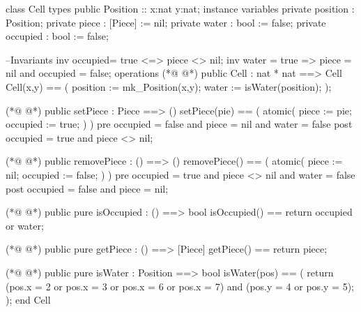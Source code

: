 \begin{vdmpp}[breaklines=true]
class Cell
types
 public Position :: x:nat y:nat;
instance variables
 private position : Position;
 private piece :  [Piece] := nil;
 private water : bool := false;
 private occupied : bool := false;
 
 --Invariants
 inv occupied= true <=> piece <> nil;
 inv water = true => piece = nil and occupied = false;
operations
(*@
\label{Cell:14}
@*)
  public Cell : nat * nat ==> Cell
   Cell(x,y) ==
   (
    position := mk_Position(x,y);
    water := isWater(position);
  );
 
(*@
\label{setPiece:21}
@*)
 public setPiece : Piece ==> ()
 setPiece(pie) == 
 (
  atomic(
   piece := pie;
   occupied := true;
   )
 )
 pre occupied = false and piece = nil and water = false
 post occupied = true and piece <> nil;
 
(*@
\label{removePiece:32}
@*)
 public removePiece : () ==> ()
 removePiece() == 
 (
  atomic(
   piece := nil;
   occupied := false;
  )
 )
 pre occupied = true and piece <> nil and water = false
 post occupied = false and piece = nil;
 
(*@
\label{isOccupied:43}
@*)
 public pure isOccupied : () ==> bool
 isOccupied() == return occupied or water;
 
(*@
\label{getPiece:46}
@*)
 public pure getPiece : () ==> [Piece]
 getPiece() == return piece;
  
(*@
\label{isWater:49}
@*)
 public pure isWater : Position ==> bool
 isWater(pos) ==
 (
  return (pos.x = 2 or pos.x = 3 or pos.x = 6 or pos.x = 7) and (pos.y = 4 or pos.y = 5);
 );
end Cell
\end{vdmpp}
